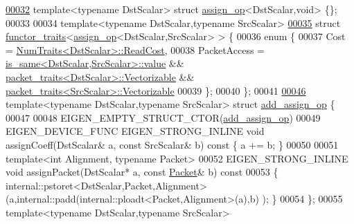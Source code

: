 \begin{DoxyCode}
\hyperlink{struct_eigen_1_1internal_1_1assign__op_3_01_dst_scalar_00_01void_01_4}{00032} \textcolor{keyword}{template}<\textcolor{keyword}{typename} DstScalar> \textcolor{keyword}{struct }\hyperlink{struct_eigen_1_1internal_1_1assign__op}{assign\_op}<DstScalar,void> \{\};
00033 
00034 \textcolor{keyword}{template}<\textcolor{keyword}{typename} DstScalar,\textcolor{keyword}{typename} SrcScalar>
\hyperlink{struct_eigen_1_1internal_1_1functor__traits_3_01assign__op_3_01_dst_scalar_00_01_src_scalar_01_4_01_4}{00035} \textcolor{keyword}{struct }\hyperlink{struct_eigen_1_1internal_1_1functor__traits}{functor\_traits}<\hyperlink{struct_eigen_1_1internal_1_1assign__op}{assign\_op}<DstScalar,SrcScalar> > \{
00036   \textcolor{keyword}{enum} \{
00037     Cost = \hyperlink{group___core___module_struct_eigen_1_1_num_traits}{NumTraits<DstScalar>::ReadCost},
00038     PacketAccess = \hyperlink{struct_eigen_1_1internal_1_1is__same}{is\_same<DstScalar,SrcScalar>::value} && 
      \hyperlink{struct_eigen_1_1internal_1_1packet__traits}{packet\_traits<DstScalar>::Vectorizable} && 
      \hyperlink{struct_eigen_1_1internal_1_1packet__traits}{packet\_traits<SrcScalar>::Vectorizable}
00039   \};
00040 \};
00041 
\hyperlink{struct_eigen_1_1internal_1_1add__assign__op}{00046} \textcolor{keyword}{template}<\textcolor{keyword}{typename} DstScalar,\textcolor{keyword}{typename} SrcScalar> \textcolor{keyword}{struct }\hyperlink{struct_eigen_1_1internal_1_1add__assign__op}{add\_assign\_op} \{
00047 
00048   EIGEN\_EMPTY\_STRUCT\_CTOR(\hyperlink{struct_eigen_1_1internal_1_1add__assign__op}{add\_assign\_op})
00049   EIGEN\_DEVICE\_FUNC EIGEN\_STRONG\_INLINE \textcolor{keywordtype}{void} assignCoeff(DstScalar& a, \textcolor{keyword}{const} SrcScalar& b)\textcolor{keyword}{ const }\{ a += b; 
      \}
00050   
00051   \textcolor{keyword}{template}<\textcolor{keywordtype}{int} Alignment, \textcolor{keyword}{typename} Packet>
00052   EIGEN\_STRONG\_INLINE \textcolor{keywordtype}{void} assignPacket(DstScalar* a, \textcolor{keyword}{const} \hyperlink{union_eigen_1_1internal_1_1_packet}{Packet}& b)\textcolor{keyword}{ const}
00053 \textcolor{keyword}{  }\{ internal::pstoret<DstScalar,Packet,Alignment>(a,internal::padd(internal::ploadt<Packet,Alignment>(a),b)
      ); \}
00054 \};
00055 \textcolor{keyword}{template}<\textcolor{keyword}{typename} DstScalar,\textcolor{keyword}{typename} SrcScalar>

\end{DoxyCode}
